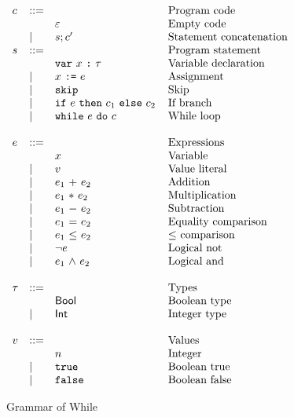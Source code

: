 \begin{figure}[h]
  \centering
  $\begin{array}{lll@{\hspace{4mm}}l}
    c &::= &  & \mbox{Program code} \\
    &  & \varepsilon & \mbox{Empty code} \\
    &| & s; c' & \mbox{Statement concatenation} \\
    s &::= & & \mbox{Program statement} \\
    &  & \WhDecl{x}{\tau} & \mbox{Variable declaration} \\
    &| & \WhAssign{x}{e} & \mbox{Assignment} \\
    &| & \WhSkip & \mbox{Skip} \\
    &| & \WhIf{e}{c_1}{c_2} & \mbox{If branch} \\
    &| & \WhWhile{e}{c} & \mbox{While loop} \\
    &&&\\
    e & ::= & & \mbox{Expressions} \\
    & & x & \mbox{Variable} \\
    &| & v & \mbox{Value literal} \\
    &| & \WhAdd{e_1}{e_2} & \mbox{Addition} \\
    &| & \WhTimes{e_1}{e_2} & \mbox{Multiplication} \\
    &| & \WhMinus{e_1}{e_2} & \mbox{Subtraction} \\
    &| & \WhEq{e_1}{e_2} & \mbox{Equality comparison} \\
    &| & \WhLeq{e_1}{e_2} & \mbox{$\leq$ comparison} \\
    &| & \WhLnot{e} & \mbox{Logical not} \\
    &| & \WhLand{e_1}{e_2} & \mbox{Logical and} \\
    &&&\\
    \tau & ::= & & \mbox{Types} \\
    & & \WhBool & \mbox{Boolean type} \\
    &| & \WhInt & \mbox{Integer type} \\
    &&&\\
    v & ::= & & \mbox{Values} \\
    &  & n & \mbox{Integer} \\
    &| & \WhTrue & \mbox{Boolean true} \\
    &| & \WhFalse & \mbox{Boolean false} \\
  \end{array}$
  \caption{Grammar of While}
  \label{fig:while_grammar}
\end{figure}

